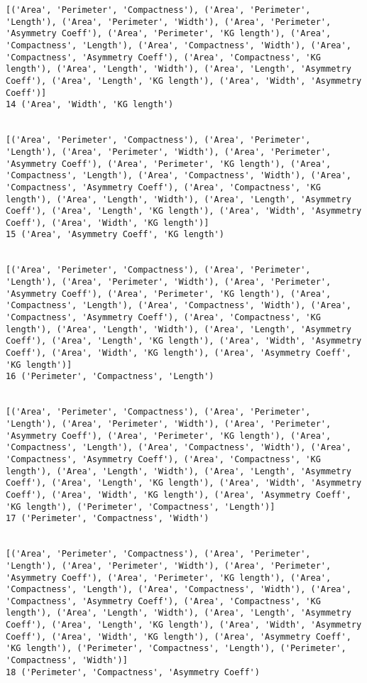 \documentclass[11pt]{article}
\begin{document}
\begin{Verbatim}[commandchars=\\\{\}]
[('Area', 'Perimeter', 'Compactness'), ('Area', 'Perimeter', 'Length'), ('Area', 'Perimeter', 'Width'), ('Area', 'Perimeter', 'Asymmetry Coeff'), ('Area', 'Perimeter', 'KG length'), ('Area', 'Compactness', 'Length'), ('Area', 'Compactness', 'Width'), ('Area', 'Compactness', 'Asymmetry Coeff'), ('Area', 'Compactness', 'KG length'), ('Area', 'Length', 'Width'), ('Area', 'Length', 'Asymmetry Coeff'), ('Area', 'Length', 'KG length'), ('Area', 'Width', 'Asymmetry Coeff')]
14 ('Area', 'Width', 'KG length')


[('Area', 'Perimeter', 'Compactness'), ('Area', 'Perimeter', 'Length'), ('Area', 'Perimeter', 'Width'), ('Area', 'Perimeter', 'Asymmetry Coeff'), ('Area', 'Perimeter', 'KG length'), ('Area', 'Compactness', 'Length'), ('Area', 'Compactness', 'Width'), ('Area', 'Compactness', 'Asymmetry Coeff'), ('Area', 'Compactness', 'KG length'), ('Area', 'Length', 'Width'), ('Area', 'Length', 'Asymmetry Coeff'), ('Area', 'Length', 'KG length'), ('Area', 'Width', 'Asymmetry Coeff'), ('Area', 'Width', 'KG length')]
15 ('Area', 'Asymmetry Coeff', 'KG length')


[('Area', 'Perimeter', 'Compactness'), ('Area', 'Perimeter', 'Length'), ('Area', 'Perimeter', 'Width'), ('Area', 'Perimeter', 'Asymmetry Coeff'), ('Area', 'Perimeter', 'KG length'), ('Area', 'Compactness', 'Length'), ('Area', 'Compactness', 'Width'), ('Area', 'Compactness', 'Asymmetry Coeff'), ('Area', 'Compactness', 'KG length'), ('Area', 'Length', 'Width'), ('Area', 'Length', 'Asymmetry Coeff'), ('Area', 'Length', 'KG length'), ('Area', 'Width', 'Asymmetry Coeff'), ('Area', 'Width', 'KG length'), ('Area', 'Asymmetry Coeff', 'KG length')]
16 ('Perimeter', 'Compactness', 'Length')


[('Area', 'Perimeter', 'Compactness'), ('Area', 'Perimeter', 'Length'), ('Area', 'Perimeter', 'Width'), ('Area', 'Perimeter', 'Asymmetry Coeff'), ('Area', 'Perimeter', 'KG length'), ('Area', 'Compactness', 'Length'), ('Area', 'Compactness', 'Width'), ('Area', 'Compactness', 'Asymmetry Coeff'), ('Area', 'Compactness', 'KG length'), ('Area', 'Length', 'Width'), ('Area', 'Length', 'Asymmetry Coeff'), ('Area', 'Length', 'KG length'), ('Area', 'Width', 'Asymmetry Coeff'), ('Area', 'Width', 'KG length'), ('Area', 'Asymmetry Coeff', 'KG length'), ('Perimeter', 'Compactness', 'Length')]
17 ('Perimeter', 'Compactness', 'Width')


[('Area', 'Perimeter', 'Compactness'), ('Area', 'Perimeter', 'Length'), ('Area', 'Perimeter', 'Width'), ('Area', 'Perimeter', 'Asymmetry Coeff'), ('Area', 'Perimeter', 'KG length'), ('Area', 'Compactness', 'Length'), ('Area', 'Compactness', 'Width'), ('Area', 'Compactness', 'Asymmetry Coeff'), ('Area', 'Compactness', 'KG length'), ('Area', 'Length', 'Width'), ('Area', 'Length', 'Asymmetry Coeff'), ('Area', 'Length', 'KG length'), ('Area', 'Width', 'Asymmetry Coeff'), ('Area', 'Width', 'KG length'), ('Area', 'Asymmetry Coeff', 'KG length'), ('Perimeter', 'Compactness', 'Length'), ('Perimeter', 'Compactness', 'Width')]
18 ('Perimeter', 'Compactness', 'Asymmetry Coeff')



\end{Verbatim}
\end{document}
